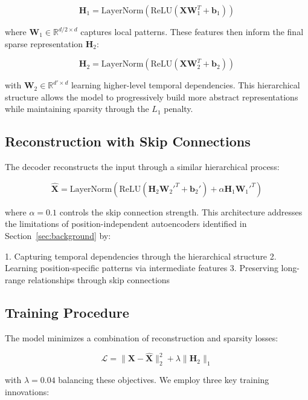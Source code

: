 \documentclass{article} %
\begin{document}
\begin{equation}
    \mathbf{H}_1 = \text{LayerNorm}(\text{ReLU}(\mathbf{X}\mathbf{W}_1^T + \mathbf{b}_1))
\end{equation}

where $\mathbf{W}_1 \in \mathbb{R}^{d/2 \times d}$ captures local patterns. These features then inform the final sparse representation $\mathbf{H}_2$:

\begin{equation}
    \mathbf{H}_2 = \text{LayerNorm}(\text{ReLU}(\mathbf{X}\mathbf{W}_2^T + \mathbf{b}_2))
\end{equation}

with $\mathbf{W}_2 \in \mathbb{R}^{d' \times d}$ learning higher-level temporal dependencies. This hierarchical structure allows the model to progressively build more abstract representations while maintaining sparsity through the $L_1$ penalty.

\subsection{Reconstruction with Skip Connections}
The decoder reconstructs the input through a similar hierarchical process:

\begin{equation}
    \hat{\mathbf{X}} = \text{LayerNorm}(\text{ReLU}(\mathbf{H}_2\mathbf{W}_2'^T + \mathbf{b}_2') + \alpha\mathbf{H}_1\mathbf{W}_1'^T)
\end{equation}

where $\alpha=0.1$ controls the skip connection strength. This architecture addresses the limitations of position-independent autoencoders identified in Section~\ref{sec:background} by:

1. Capturing temporal dependencies through the hierarchical structure
2. Learning position-specific patterns via intermediate features
3. Preserving long-range relationships through skip connections

\subsection{Training Procedure}
The model minimizes a combination of reconstruction and sparsity losses:

\begin{equation}
    \mathcal{L} = \|\mathbf{X} - \hat{\mathbf{X}}\|_2^2 + \lambda\|\mathbf{H}_2\|_1
\end{equation}

with $\lambda=0.04$ balancing these objectives. We employ three key training innovations:
\end{document}
